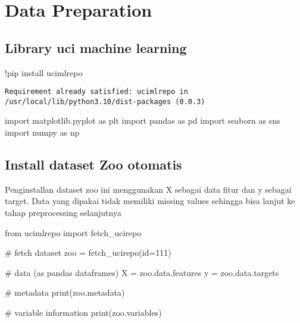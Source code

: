 \documentclass[
  letterpaper,
]{krantz}
\makeatletter
\newenvironment{Shaded}{\begin{snugshade}}{\end{snugshade}}
\newcommand{\BuiltInTok}[1]{\textcolor[rgb]{0.00,0.23,0.31}{#1}}
\newcommand{\CommentTok}[1]{\textcolor[rgb]{0.37,0.37,0.37}{#1}}
\newcommand{\DecValTok}[1]{\textcolor[rgb]{0.68,0.00,0.00}{#1}}
\newcommand{\ImportTok}[1]{\textcolor[rgb]{0.00,0.46,0.62}{#1}}
\newcommand{\NormalTok}[1]{\textcolor[rgb]{0.00,0.23,0.31}{#1}}
\newcommand{\OperatorTok}[1]{\textcolor[rgb]{0.37,0.37,0.37}{#1}}
\newenvironment{kframe}{%
\medskip{}
\setlength{\fboxsep}{.8em}
 \def\at@end@of@kframe{}%
 \ifinner\ifhmode%
  \def\at@end@of@kframe{\end{minipage}}%
  \begin{minipage}{\columnwidth}%
 \fi\fi%
 \def\FrameCommand##1{\hskip\@totalleftmargin \hskip-\fboxsep
 \colorbox{shadecolor}{##1}\hskip-\fboxsep
     \hskip-\linewidth \hskip-\@totalleftmargin \hskip\columnwidth}%
 \MakeFramed {\advance\hsize-\width
   \@totalleftmargin\z@ \linewidth\hsize
   \@setminipage}}%
 {\par\unskip\endMakeFramed%
 \at@end@of@kframe}
\renewenvironment{Shaded}{\begin{kframe}}{\end{kframe}}
\makeatother
\begin{document}
\hypertarget{data-preparation}{%
\section{Data Preparation}\label{data-preparation}}

\hypertarget{library-uci-machine-learning}{%
\subsection{Library uci machine
learning}\label{library-uci-machine-learning}}

\begin{Shaded}
\begin{Highlighting}[]
\OperatorTok{!}\NormalTok{pip install ucimlrepo}
\end{Highlighting}
\end{Shaded}

\begin{verbatim}
Requirement already satisfied: ucimlrepo in /usr/local/lib/python3.10/dist-packages (0.0.3)
\end{verbatim}

\begin{Shaded}
\begin{Highlighting}[]
\ImportTok{import}\NormalTok{ matplotlib.pyplot }\ImportTok{as}\NormalTok{ plt}
\ImportTok{import}\NormalTok{ pandas }\ImportTok{as}\NormalTok{ pd}
\ImportTok{import}\NormalTok{ seaborn }\ImportTok{as}\NormalTok{ sns}
\ImportTok{import}\NormalTok{ numpy }\ImportTok{as}\NormalTok{ np}
\end{Highlighting}
\end{Shaded}

\hypertarget{install-dataset-zoo-otomatis}{%
\subsection{Install dataset Zoo
otomatis}\label{install-dataset-zoo-otomatis}}

Penginstallan dataset zoo ini menggunakan X sebagai data fitur dan y
sebagai target. Data yang dipakai tidak memiliki missing values sehingga
bisa lanjut ke tahap preprocessing selanjutnya

\begin{Shaded}
\begin{Highlighting}[]
\ImportTok{from}\NormalTok{ ucimlrepo }\ImportTok{import}\NormalTok{ fetch\_ucirepo}

\CommentTok{\# fetch dataset}
\NormalTok{zoo }\OperatorTok{=}\NormalTok{ fetch\_ucirepo(}\BuiltInTok{id}\OperatorTok{=}\DecValTok{111}\NormalTok{)}

\CommentTok{\# data (as pandas dataframes)}
\NormalTok{X }\OperatorTok{=}\NormalTok{ zoo.data.features}
\NormalTok{y }\OperatorTok{=}\NormalTok{ zoo.data.targets}


\CommentTok{\# metadata}
\BuiltInTok{print}\NormalTok{(zoo.metadata)}

\CommentTok{\# variable information}
\BuiltInTok{print}\NormalTok{(zoo.variables)}
\end{Highlighting}
\end{Shaded}
\end{document}
